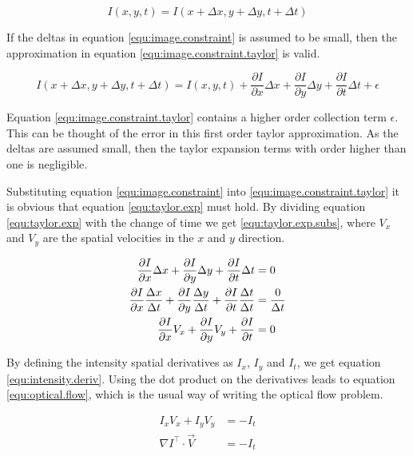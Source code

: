 \begin{equation}
I(x,y,t) = I(x + \Delta x, y+ \Delta y, t + \Delta t)
\label{equ:image.constraint}
\end{equation}

If the deltas in equation \eqref{equ:image.constraint} is assumed to be small, then the approximation in equation \eqref{equ:image.constraint.taylor} is valid.

\begin{equation}
I(x + \Delta x, y+ \Delta y, t + \Delta t) = I(x,y,t) + \frac{\partial I}{\partial x} \Delta x + \frac{\partial I}{\partial y} \Delta y + \frac{\partial I}{\partial t} \Delta t + \epsilon
\label{equ:image.constraint.taylor}
\end{equation}

Equation \eqref{equ:image.constraint.taylor} contains a higher order collection term $\epsilon$. This can be thought of the error in this first order taylor approximation. As
the deltas are assumed small, then the taylor expansion terms with order higher than one is negligible. 

Substituting equation \eqref{equ:image.constraint} into \eqref{equ:image.constraint.taylor} it is obvious that equation \eqref{equ:taylor.exp} must hold. 
By dividing equation \eqref{equ:taylor.exp} with the change of time we get \eqref{equ:taylor.exp.subs}, where $V_x$ and $V_y$ are the spatial velocities in the 
$x$ and $y$ direction.

\begin{align}
\frac{\partial I}{\partial x} \Delta x + \frac{\partial I}{\partial y} \Delta y + \frac{\partial I}{\partial t} \Delta t &= 0 \label{equ:taylor.exp} \\
\frac{\partial I}{\partial x} \frac{\Delta x}{\Delta t} + \frac{\partial I}{\partial y} \frac{\Delta y}{\Delta t} + \frac{\partial I}{\partial t} \frac{\Delta t}{\Delta t} &= \frac{0}{\Delta t} \notag \\
\frac{\partial I}{\partial x} V_x + \frac{\partial I}{\partial y} V_y + \frac{\partial I}{\partial t}  &= 0 \label{equ:taylor.exp.subs}
\end{align}

By defining the intensity spatial derivatives as $I_x$, $I_y$ and $I_t$, we get equation \eqref{equ:intensity.deriv}. Using the dot product on the derivatives 
leads to equation \eqref{equ:optical.flow}, which is the usual way of writing the optical flow problem.

\begin{align}
I_x V_x + I_y V_y &= -I_t \label{equ:intensity.deriv} \\
\nabla I^\top \cdot \vec{V} &= -I_t \label{equ:optical.flow}
\end{align}


